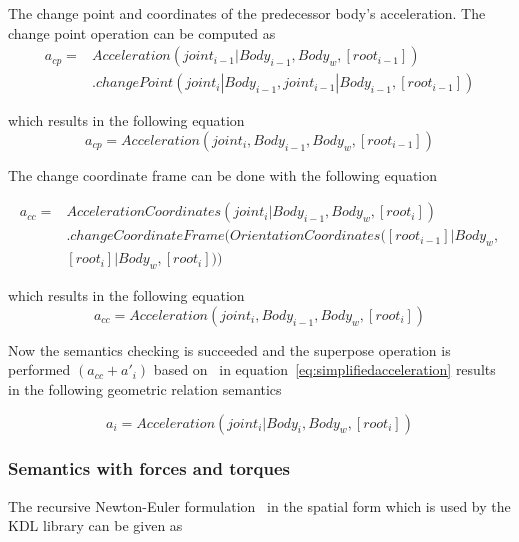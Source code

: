 The change point and coordinates of the predecessor body's acceleration. The change point operation can be computed as
\begin{equation}
\begin{aligned}
a_{cp} = {} & Acceleration(joint_{i-1}|Body_{i-1}, Body_w,  [root_{i-1}]) \\ 
& .changePoint(joint_i|Body_{i-1}, joint_{i-1}|Body_{i-1}, [root_{i-1}])
\end{aligned}
\end{equation}

which results in the following equation
\begin{equation}
a_{cp} = Acceleration(joint_i, Body_{i-1}, Body_w, [root_{i-1}])
\end{equation}

The change coordinate frame can be done with the following equation

\begin{equation}
\begin{aligned}
a_{cc} = {} & AccelerationCoordinates(joint_i|Body_{i-1}, Body_w, [root_i]) \\ & .changeCoordinateFrame(OrientationCoordinates([root_{i-1}]|Body_w, \\&[root_i]|Body_w, [root_i]))
\end{aligned}
\end{equation}

which results in the following equation
\begin{equation}
a_{cc} = Acceleration(joint_i, Body_{i-1}, Body_w, [root_i]) 
\end{equation}

Now the semantics checking is succeeded and the superpose operation is performed $(a_{cc} + a'_i)$ based on~\cite{traversaro2016multibody} in equation~\ref{eq:simplifiedacceleration} results in the following geometric relation semantics

\begin{equation}
a_i = Acceleration(joint_i | Body_i, Body_w, [root_i])
\label{eq:finalacceleration}
\end{equation}

\subsubsection*{Semantics with forces and torques}

The recursive Newton-Euler formulation~\cite{smits2011kdl} in the spatial form which is used by the KDL library can be given as

